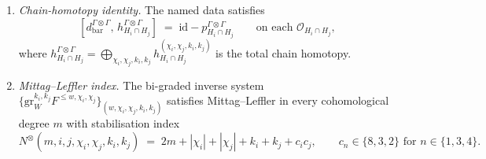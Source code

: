 \begin{theorem}
\begin{enumerate}[label=\textup{(\alph*)}]
\item \emph{Chain-homotopy identity.} The named data satisfies
\begin{equation}
\label{eq:wall-of-walls-chain-homotopy-identity}
[d^{\Gamma\otimes\Gamma}_{\mathrm{bar}},\,
 h^{\Gamma\otimes\Gamma}_{H_i\cap H_j}]
\;=\;
\mathrm{id} - p^{\Gamma\otimes\Gamma}_{H_i\cap H_j}
\qquad
\text{on each }\widehat{\mathcal{O}}_{H_i\cap H_j},
\end{equation}
where
$h^{\Gamma\otimes\Gamma}_{H_i\cap H_j}
= \bigoplus_{\chi_i,\chi_j,k_i,k_j}
h^{(\chi_i,\chi_j,k_i,k_j)}_{H_i\cap H_j}$
is the total chain homotopy.
\item \emph{Mittag--Leffler index.} The bi-graded inverse system
$\{\mathrm{gr}^{k_i,k_j}_W F^{\leq w,\chi_i,\chi_j}\}_{(w,\chi_i,\chi_j,k_i,k_j)}$
satisfies Mittag--Leffler in every cohomological degree $m$ with
stabilisation index
\[
N^{\otimes}(m,i,j,\chi_i,\chi_j,k_i,k_j)
\;=\;
2m + |\chi_i|+|\chi_j|+k_i+k_j+c_i c_j,
\qquad
c_n\in\{8,3,2\}\text{ for }n\in\{1,3,4\}.
\]
\end{enumerate}
\end{theorem}

